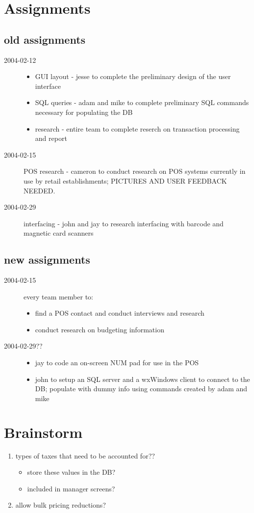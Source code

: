 \documentclass{article}
\begin{document}
\section{Assignments}
\subsection{old assignments}
\begin{description}
    \item[2004-02-12]
    \begin{itemize}
        \item GUI layout - jesse to complete the preliminary design of the user interface
        \item SQL queries - adam and mike to complete preliminary SQL commands necessary for populating the DB
        \item research - entire team to complete reserch on transaction processing and report
    \end{itemize}
    \item[2004-02-15] POS research - cameron to conduct research on POS systems currently in use by retail establishments; PICTURES AND USER FEEDBACK NEEDED.
    \item[2004-02-29] interfacing - john and jay to research interfacing with barcode and magnetic card scanners
\end{description}

\subsection{new assignments}
\begin{description}
    \item[2004-02-15] every team member to:
    \begin{itemize}
        \item find a POS contact and conduct interviews and research
        \item conduct research on budgeting information
    \end{itemize}
    \item[2004-02-29??]
    \begin{itemize}
        \item jay to code an on-screen NUM pad for use in the POS
        \item john to setup an SQL server and a wxWindows client to connect to the DB; populate with dummy info using commands created by adam and mike
    \end{itemize}
\end{description}

\section{Brainstorm}
\begin{enumerate}
    \item types of taxes that need to be accounted for??
        \begin{itemize}
            \item store these values in the DB?
            \item included in manager screens?
        \end{itemize}
    \item allow bulk pricing reductions?
\end{enumerate}
\end{document}
